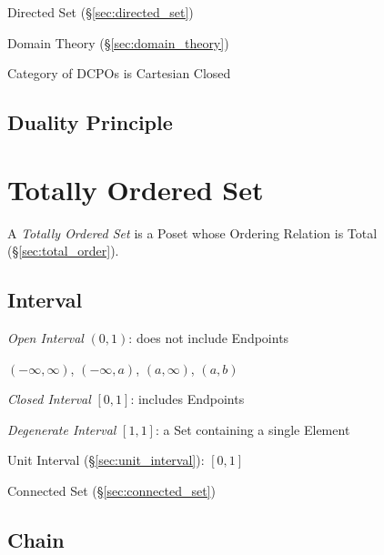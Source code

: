 Directed Set (\S\ref{sec:directed_set})

Domain Theory (\S\ref{sec:domain_theory})

Category of DCPOs is Cartesian Closed



\subsection{Duality Principle}\label{sec:duality_principle}



\section{Totally Ordered Set}\label{sec:totally_ordered}

A \emph{Totally Ordered Set} is a Poset whose Ordering Relation is
Total (\S\ref{sec:total_order}).


\subsection{Interval}\label{sec:interval}

\emph{Open Interval} $(0,1)$: does not include Endpoints

$(-\infty, \infty)$, $(-\infty,a)$, $(a,\infty)$, $(a,b)$

\emph{Closed Interval} $[0,1]$: includes Endpoints

\emph{Degenerate Interval} $[1,1]$: a Set containing a single Element

Unit Interval (\S\ref{sec:unit_interval}): $[0,1]$

Connected Set (\S\ref{sec:connected_set})



\subsection{Chain}\label{sec:chain}

